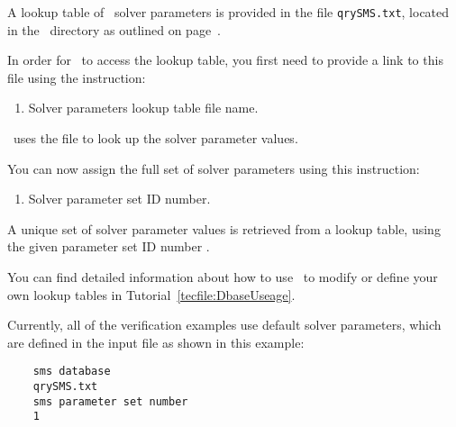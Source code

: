 \label{section:SolverParameters}
A lookup table of \mfus\ solver parameters is provided in the file \texttt{qrySMS.txt}, located in the \bin\ directory as outlined on page~\pageref{page:userbin}.

In order for \mut\ to access the lookup table, you first need to provide a link to this file using the instruction:

    {
        \squish
        \begin{enumerate}
        \item {}  Solver parameters lookup table file name.
        \end{enumerate}
          \mut\ uses the file  to look up the solver parameter values.
    }

You can now assign the full set of solver parameters using this instruction:

    {
        \squish
        \begin{enumerate}
        \item {}  Solver parameter set ID number.
        \end{enumerate}
          A unique set of solver parameter values is retrieved from a lookup table, using the given parameter set ID number .
    }

You can find detailed information about how to use \dbase\ to modify or define your own lookup tables in Tutorial~\ref{tecfile:DbaseUseage}.

Currently, all of the verification examples use default solver parameters, which are defined in the input file as shown in this example:
\begin{verbatim}
    sms database
    qrySMS.txt
    sms parameter set number
    1
\end{verbatim}

